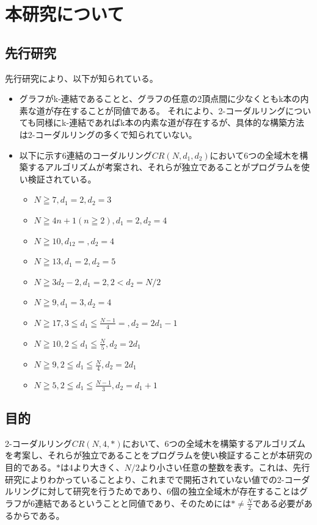 \documentclass[twocolumn, 11pt]{jsarticle}
\begin{document}
\section{本研究について}
    \subsection{先行研究}
        先行研究により、以下が知られている。
        \begin{itemize}
            \item グラフがk-連結であることと、グラフの任意の2頂点間に少なくともk本の内素な道が存在することが同値である。 \cite{YukihiroHAMADA2016} それにより、2-コーダルリングについても同様にk-連結であればk本の内素な道が存在するが、具体的な構築方法は2-コーダルリングの多くで知られていない。
            \item 以下に示す6連結のコーダルリング$CR(N,d_1,d_2)$において6つの全域木を構築するアルゴリズムが考案され、それらが独立であることがプログラムを使い検証されている。\cite{Yokooji}
                \begin{itemize}
                    \item $N\geqq7, d_1=2, d_2=3$
                    \item $N\geqq4n+1(n\geqq2), d_1=2, d_2=4$
                    \item $N\geqq10, d_12=, d_2=4$
                    \item $N\geqq13, d_1=2, d_2=5$
                    \item $N\geqq3d_2-2, d_1=2, 2<d_2=N/2$
                    \item $N\geqq9, d_1=3, d_2=4$
                    \item $N\geqq17, 3\leqq d_1\leqq\frac{N-1}{4}=, d_2=2d_1-1$
                    \item $N\geqq10, 2\leqq d_1\leqq\frac{N}{5}, d_2=2d_1$
                    \item $N\geqq9, 2\leqq d_1\leqq\frac{N}{4}, d_2=2d_1$
                    \item $N\geqq5, 2\leqq d_1\leqq\frac{N-1}{3}, d_2=d_1+1$
                \end{itemize}
        \end{itemize}
        
    \subsection{目的}
        2-コーダルリング$CR(N, 4, *)$において、6つの全域木を構築するアルゴリズムを考案し、それらが独立であることをプログラムを使い検証することが本研究の目的である。$*$は4より大きく、$N/2$より小さい任意の整数を表す。これは、先行研究によりわかっていることより、これまでで開拓されていない値での2-コーダルリングに対して研究を行うためであり、6個の独立全域木が存在することはグラフが6連結であるということと同値であり、そのためには$*\neq\frac{N}{2}$である必要があるからである。
\end{document}
